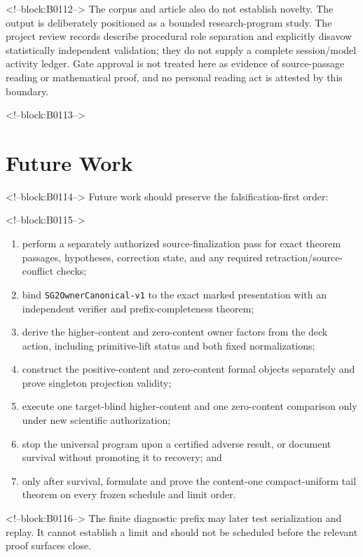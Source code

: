 \documentclass[11pt]{article}
\providecommand{\tightlist}{\setlength{\itemsep}{0pt}\setlength{\parskip}{0pt}}
\begin{document}
<!--block:B0112-->
The corpus and article also do not establish novelty. The output is
deliberately positioned as a bounded research-program study.
The project review records describe procedural role separation and explicitly
disavow statistically independent validation; they do not supply a complete
session/model activity ledger. Gate approval is not treated here as evidence of
source-passage reading or mathematical proof, and no personal reading act is
attested by this boundary.

<!--block:B0113-->
\hypertarget{9-future-work}{%
\section{Future Work}\label{9-future-work}}

<!--block:B0114-->
Future work should preserve the falsification-first order:

<!--block:B0115-->
\begin{enumerate}
\def\labelenumi{\arabic{enumi}.}
\tightlist
\item
  perform a separately authorized source-finalization pass for exact
  theorem passages, hypotheses, correction state, and any required
  retraction/source-conflict checks;
\item
  bind \texttt{SG2OwnerCanonical-v1} to the exact marked presentation
  with an independent verifier and prefix-completeness theorem;
\item
  derive the higher-content and zero-content owner factors from the deck
  action, including primitive-lift status and both fixed normalizations;
\item
  construct the positive-content and zero-content formal objects
  separately and prove singleton projection validity;
\item
  execute one target-blind higher-content and one zero-content
  comparison only under new scientific authorization;
\item
  stop the universal program upon a certified adverse result, or
  document survival without promoting it to recovery; and
\item
  only after survival, formulate and prove the content-one
  compact-uniform tail theorem on every frozen schedule and limit order.
\end{enumerate}

<!--block:B0116-->
The finite diagnostic prefix may later test serialization and replay. It
cannot establish a limit and should not be scheduled before the relevant
proof surfaces close.
\end{document}
